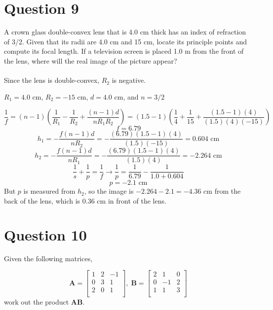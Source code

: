 \documentclass[a4paper]{article}
\begin{document}
\section*{Question 9}
A crown glass double-convex lens that is 4.0 cm thick has an index of refraction of 3/2. Given that
its radii are 4.0 cm and 15 cm, locate its principle points and compute its focal length. If a television
screen is placed 1.0 m from the front of the lens, where will the real image of the picture appear?\\\\

Since the lens is double-convex, $R_2$ is negative.
\begin{center}
    $R_1 = 4.0$ cm, $R_2 = -15$ cm, $d = 4.0$ cm, and $n = 3/2$
\end{center}
$$ \frac{1}{f} = (n - 1) \left(\frac{1}{R_1} - \frac{1}{R_2} + \frac{(n-1)d}{nR_1 R_2}\right) = (1.5 - 1) \left(\frac{1}{4} + \frac{1}{15} + \frac{(1.5-1)(4)}{(1.5)(4)(-15)}\right)$$
$$ f = 6.79 $$
$$ h_1 = - \frac{f(n-1)d}{nR_2} = - \frac{(6.79)(1.5-1)(4)}{(1.5)(-15)} = 0.604 \textrm{ cm}$$
$$ h_2 = - \frac{f(n-1)d}{nR_1} = - \frac{(6.79)(1.5-1)(4)}{(1.5)(4)} = -2.264 \textrm{ cm}$$
$$ \frac{1}{s} + \frac{1}{p} = \frac{1}{f} \rightarrow \frac{1}{p} = \frac{1}{6.79} - \frac{1}{1.0 + 0.604}$$
$$ p = -2.1 \textrm{ cm}$$
But $p$ is measured from $h_2$, so the image is $-2.264 - 2.1 = -4.36$ cm from the back of the lens, which is 0.36 cm in front of the lens.

\section*{Question 10}
Given the following matrices,

$$ 
\bm{A} = \begin{bmatrix}
    1 & 2 & -1 \\
    0 & 3 & 1 \\
    2 & 0 & 1 \\
\end{bmatrix},\;
\bm{B} = \begin{bmatrix}
    2 & 1 & 0 \\
    0 & -1 & 2 \\
    1 & 1 & 3 \\
\end{bmatrix} $$
work out the product $\bm{A}\bm{B}$.\\\\
\end{document}
